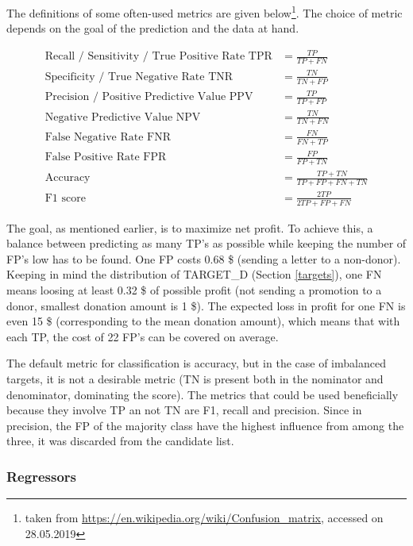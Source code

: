 \documentclass[
  11pt,
  a4paper,
  DIV=12,captions=tableheading,oneside,titlepage]{scrbook}
\begin{document}
The definitions of some often-used metrics are given below\footnote{taken from \url{https://en.wikipedia.org/wiki/Confusion_matrix}, accessed on 28.05.2019}. The choice of metric depends on the goal of the prediction and the data at hand.

\begin{align*}
\text{Recall / Sensitivity / True Positive Rate TPR} &= \frac{TP}{TP + FN} \\
\text{Specificity / True Negative Rate TNR} &= \frac{TN}{TN+FP} \\ 
\text{Precision / Positive Predictive Value PPV} &= \frac{TP}{TP + FP}\\
\text{Negative Predictive Value NPV} &= \frac{TN}{TN+FN}\\
\text{False Negative Rate FNR} &= \frac{FN}{FN+TP}\\
\text{False Positive Rate FPR} &= \frac{FP}{FP+TN}\\
\text{Accuracy} &= \frac{TP + TN}{TP + FP + FN + TN} \\
\text{F1 score} &= \frac{2TP}{2TP+FP+FN}
\end{align*}

The goal, as mentioned earlier, is to maximize net profit. To achieve this, a balance between predicting as many TP's as possible while keeping the number of FP's low has to be found. One FP costs 0.68 \$ (sending a letter to a non-donor). Keeping in mind the distribution of TARGET\_D (Section \ref{targets}), one FN means loosing at least 0.32 \$ of possible profit (not sending a promotion to a donor, smallest donation amount is 1 \$). The expected loss in profit for one FN is even 15 \$ (corresponding to the mean donation amount), which means that with each TP, the cost of 22 FP's can be covered on average.

The default metric for classification is accuracy, but in the case of imbalanced targets, it is not a desirable metric (TN is present both in the nominator and denominator, dominating the score). The metrics that could be used beneficially because they involve TP an not TN are F1, recall and precision. Since in precision, the FP of the majority class have the highest influence from among the three, it was discarded from the candidate list.

\hypertarget{regressors}{%
\subsubsection{Regressors}\label{regressors}}
\end{document}
